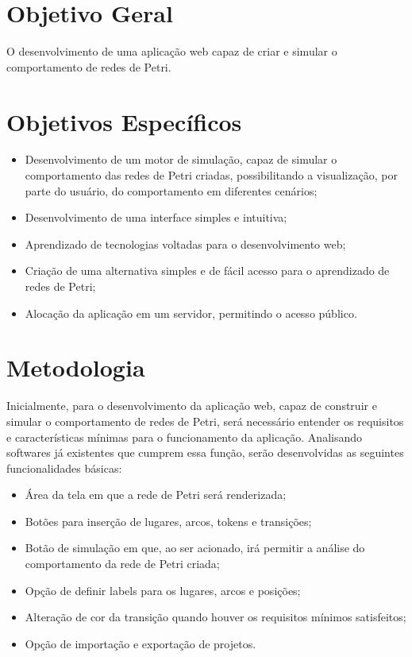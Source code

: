 \documentclass[
	12pt,				%
	openright,			%
	oneside,			%
	a4paper,			%
	english,			%
	brazil				%
	]{abntex2}
\begin{document}
\section{Objetivo Geral}

O desenvolvimento de uma aplicação web capaz de criar e simular o comportamento de redes de Petri.

\section{Objetivos Específicos}

\begin{itemize}
        \item Desenvolvimento de um motor de simulação, capaz de simular o comportamento das redes de Petri criadas, possibilitando a visualização, por parte do usuário, do comportamento em diferentes cenários;
        \item Desenvolvimento de uma interface simples e intuitiva; 
	\item Aprendizado de tecnologias voltadas para o desenvolvimento web; 
	\item Criação de uma alternativa simples e de fácil acesso para o aprendizado de redes de Petri;
        \item Alocação da aplicação em um servidor, permitindo o acesso público.
\end{itemize}


\section{Metodologia}


Inicialmente, para o desenvolvimento da aplicação web, capaz de construir e simular o comportamento de redes de Petri, será necessário entender os requisitos e características mínimas para o funcionamento da aplicação. Analisando softwares já existentes que cumprem essa função, serão desenvolvidas as seguintes funcionalidades básicas:

\begin{itemize}
        \item Área da tela em que a rede de Petri será renderizada;
        \item Botões para inserção de lugares, arcos, tokens e transições;
        \item Botão de simulação em que, ao ser acionado, irá permitir a análise do comportamento da rede de Petri criada;
        \item Opção de definir labels para os lugares, arcos e posições;
        \item Alteração de cor da transição quando houver os requisitos mínimos satisfeitos;
        \item Opção de importação e exportação de projetos.
\end{itemize}
\end{document}
